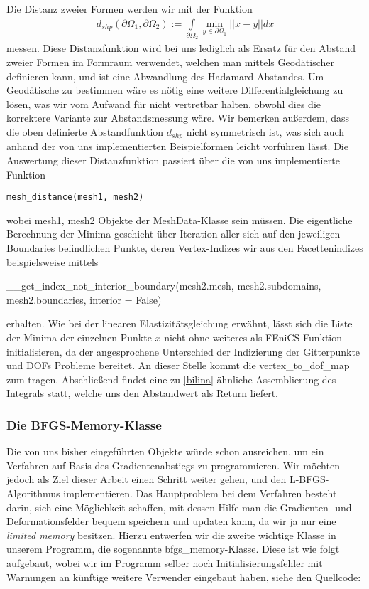 Die Distanz zweier Formen werden wir mit der Funktion
\begin{align}\label{distfktdef}
	d_{shp}(\partial\Omega_1, \partial\Omega_2) := \underset{\partial\Omega_2}{\int} \underset{y\in\partial\Omega_1}{\min} \vert\vert x - y \vert\vert dx
\end{align}
messen. Diese Distanzfunktion wird bei uns lediglich als Ersatz für den Abstand zweier Formen im Formraum verwendet, welchen man mittels Geodätischer definieren kann, und ist eine Abwandlung des Hadamard-Abstandes. Um Geodätische zu bestimmen wäre es nötig eine weitere Differentialgleichung zu lösen, was wir vom Aufwand für nicht vertretbar halten, obwohl dies die korrektere Variante zur Abstandsmessung wäre. Wir bemerken außerdem, dass die oben definierte Abstandfunktion $d_{shp}$ nicht symmetrisch ist, was sich auch anhand der von uns implementierten Beispielformen leicht vorführen lässt. Die Auswertung dieser Distanzfunktion passiert über die von uns implementierte Funktion
\begin{lstlisting}
mesh_distance(mesh1, mesh2)
\end{lstlisting}
wobei \textsf{mesh1, mesh2} Objekte der \textsf{MeshData}-Klasse sein müssen. Die eigentliche Berechnung der Minima geschieht über Iteration aller sich auf den jeweiligen Boundaries befindlichen Punkte, deren Vertex-Indizes wir aus den Facettenindizes beispielsweise mittels     
\begin{center}
\textsf{\_\_get\_index\_not\_interior\_boundary(mesh2.mesh, mesh2.subdomains, mesh2.boundaries, interior = False)}
\end{center}
erhalten. Wie bei der linearen Elastizitätsgleichung erwähnt, lässt sich die Liste der Minima der einzelnen Punkte $x$ nicht ohne weiteres als FEniCS-Funktion initialisieren, da der angesprochene Unterschied der Indizierung der Gitterpunkte und DOFs Probleme bereitet. An dieser Stelle kommt die \textsf{vertex\_to\_dof\_map} zum tragen. Abschließend findet eine zu \ref{bilina} ähnliche Assemblierung des Integrals statt, welche uns den Abstandwert als Return liefert. 

\subsubsection{Die BFGS-Memory-Klasse}

Die von uns bisher eingeführten Objekte würde schon ausreichen, um ein Verfahren auf Basis des Gradientenabstiegs zu programmieren. Wir möchten jedoch als Ziel dieser Arbeit einen Schritt weiter gehen, und den L-BFGS-Algorithmus implementieren. Das Hauptproblem bei dem Verfahren besteht darin, sich eine Möglichkeit schaffen, mit dessen Hilfe man die Gradienten- und Deformationsfelder bequem speichern und updaten kann, da wir ja nur eine \textit{limited memory} besitzen. Hierzu entwerfen wir die zweite wichtige Klasse in unserem Programm, die sogenannte \textsf{bfgs\_memory}-Klasse. Diese ist wie folgt aufgebaut, wobei wir im Programm selber noch Initialisierungsfehler mit Warnungen an künftige weitere Verwender eingebaut haben, siehe den Quellcode:

